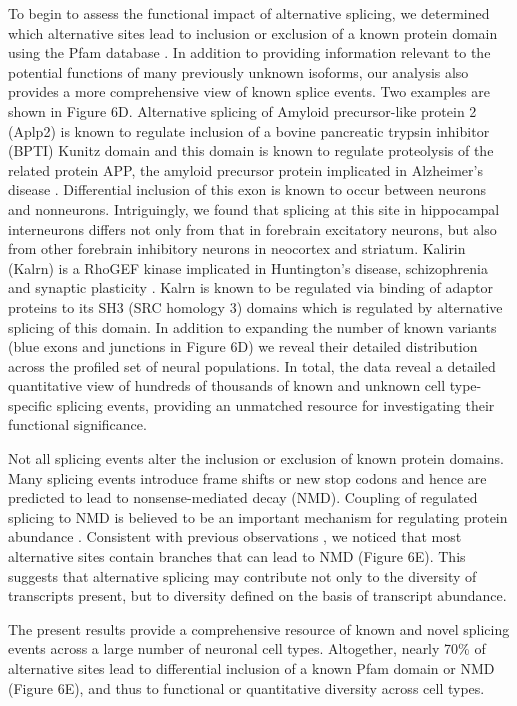 To begin to assess the functional impact of alternative splicing, we determined which alternative sites lead to inclusion or exclusion of a known protein domain using the Pfam database \citep{Finn_2015}. In addition to providing information relevant to the potential functions of many previously unknown isoforms, our analysis also provides a more comprehensive view of known splice events. Two examples are shown in Figure 6D. Alternative splicing of Amyloid precursor-like protein 2 (Aplp2) is known to regulate inclusion of a bovine pancreatic trypsin inhibitor (BPTI) Kunitz domain \citep{Sandbrink_1997} and this domain is known to regulate proteolysis of the related protein APP, the amyloid precursor protein implicated in Alzheimer's disease \citep{Beckmann_2016}. Differential inclusion of this exon is known to occur between neurons and nonneurons. Intriguingly, we found that splicing at this site in hippocampal interneurons differs not only from that in forebrain excitatory neurons, but also from other forebrain inhibitory neurons in neocortex and striatum. Kalirin (Kalrn) is a RhoGEF kinase implicated in Huntington's disease, schizophrenia and synaptic plasticity \citep{Penzes_2008}. Kalrn is known to be regulated via binding of adaptor proteins to its SH3 (SRC homology 3) domains \citep{Schiller_2006} which is regulated by alternative splicing of this domain. In addition to expanding the number of known variants (blue exons and junctions in Figure 6D) we reveal their detailed distribution across the profiled set of neural populations. In total, the data reveal a detailed quantitative view of hundreds of thousands of known and unknown cell type-specific splicing events, providing an unmatched resource for investigating their functional significance.

Not all splicing events alter the inclusion or exclusion of known protein domains. Many splicing events introduce frame shifts or new stop codons and hence are predicted to lead to nonsense-mediated decay (NMD). Coupling of regulated splicing to NMD is believed to be an important mechanism for regulating protein abundance \cite{Lewis_2002}. Consistent with previous observations \citep{Yan_2015,Mauger_2017}, we noticed that most alternative sites contain branches that can lead to NMD (Figure 6E). This suggests that alternative splicing may contribute not only to the diversity of transcripts present, but to diversity defined on the basis of transcript abundance. 

The present results provide a comprehensive resource of known and novel splicing events across a large number of neuronal cell types. Altogether, nearly 70\% of alternative sites lead to differential inclusion of a known Pfam domain or NMD (Figure 6E), and thus to functional or quantitative diversity across cell types.
